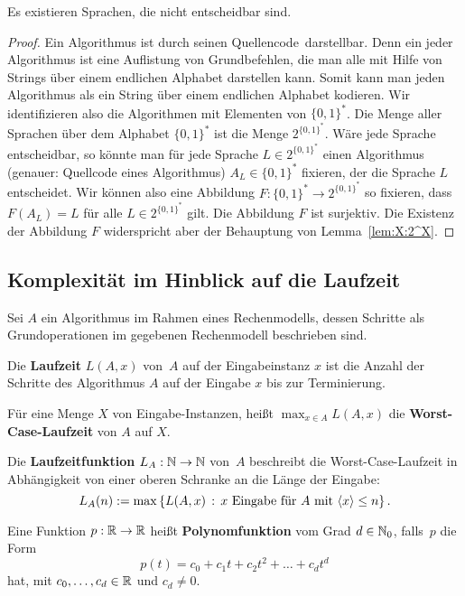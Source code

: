 \begin{thm}
	Es existieren Sprachen, die nicht entscheidbar sind. 
\end{thm} 
\begin{proof} 
		Ein Algorithmus ist durch seinen \glqq Quellencode\grqq\ darstellbar. Denn ein jeder Algorithmus ist eine Auflistung von Grundbefehlen, die man alle mit Hilfe von Strings über einem endlichen Alphabet darstellen kann. Somit kann  man jeden Algorithmus als ein String über einem endlichen Alphabet kodieren. Wir identifizieren also die Algorithmen mit Elementen von $\{0,1\}^\ast$. Die Menge aller Sprachen über dem Alphabet $\{0,1\}^\ast$ ist die Menge $2^{\{0,1\}^\ast}$. Wäre jede Sprache entscheidbar, so könnte man für jede Sprache $L \in 2^{\{0,1\}^\ast}$ einen Algorithmus (genauer: Quellcode eines Algorithmus) $A_L \in \{0,1\}^\ast$ fixieren, der die Sprache $L$ entscheidet. Wir können also eine Abbildung $F : \{0,1\}^\ast \to 2^{\{0,1\}^\ast}$ so fixieren, dass $F(A_L) = L$ für alle $L \in 2^{\{0,1\}^\ast}$ gilt. Die Abbildung $F$ ist surjektiv. Die Existenz der Abbildung $F$ widerspricht aber der Behauptung von Lemma~\ref{lem:X:2^X}.
\end{proof} 

\subsection{Komplexität im Hinblick auf die Laufzeit} 

\begin{defn} 
	Sei $A$ ein Algorithmus im Rahmen eines Rechenmodells, dessen Schritte als Grundoperationen im gegebenen Rechenmodell beschrieben sind. 

Die \textbf{Laufzeit} $L(A,x)$ von~$A$ auf der Eingabeinstanz $x$ ist die Anzahl der Schritte des Algorithmus $A$ auf der Eingabe $x$ bis zur Terminierung. 

Für eine Menge $X$ von Eingabe-Instanzen, heißt $\max_{x \in A} L(A,x)$ die \textbf{Worst-Case-Laufzeit} von $A$ auf $X$. 

Die \textbf{Laufzeitfunktion} $L_A : \mathbb{N} \to \mathbb{N}$ von~$A$ beschreibt die Worst-Case-Laufzeit in Abhängigkeit von einer oberen Schranke an die Länge der Eingabe: 
\[
L_A(n) := \max \setcond{  L(A,x) }{x \ \text{Eingabe für} \ A  \ \text{mit} \ \encl{x} \le n}.
\]
\end{defn} 

\begin{defn}
	Eine Funktion $p : \mathbb{R} \to \mathbb{R}$ heißt \textbf{Polynomfunktion} vom Grad $d \in \mathbb{N}_0$, falls~$p$ die Form \[
		p(t)= c_0 + c_1 t + c_2 t^2 + \ldots + c_d t^d
	\]
	hat, mit $c_0,\ldots,c_d \in \mathbb{R}$ und $c_d \ne 0$. 
\end{defn} 

